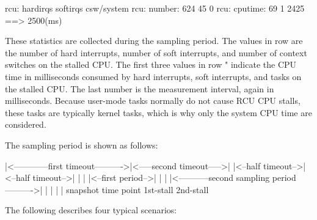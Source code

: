 \begin{VerbatimU}
  rcu:          hardirqs   softirqs   csw/system
  rcu:  number:      624         45            0
  rcu: cputime:       69          1         2425   ==> 2500(ms)
\end{VerbatimU}

These statistics are collected during the sampling period.
The values
in row  are the number of hard interrupts, number of soft
interrupts, and number of context switches on the stalled CPU\@.
The
first three values in row " indicate the CPU time in
milliseconds consumed by hard interrupts, soft interrupts, and tasks
on the stalled CPU\@.
The last number is the measurement interval, again
in milliseconds.
Because user-mode tasks normally do not cause RCU CPU
stalls, these tasks are typically kernel tasks, which is why only the
system CPU time are considered.

The sampling period is shown as follows:

\begin{VerbatimU}
  |<------------first timeout---------->|<-----second timeout----->|
  |<--half timeout-->|<--half timeout-->|                          |
  |                  |<--first period-->|                          |
  |                  |<-----------second sampling period---------->|
  |                  |                  |                          |
             snapshot time point    1st-stall                  2nd-stall
\end{VerbatimU}

The following describes four typical scenarios:

